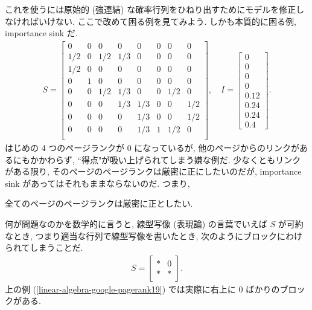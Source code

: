 \documentclass[openany, a4paper, oneside]{jsbook}
\begin{document}
これを使うには原始的 (強連結) な確率行列をひねり出すためにモデルを修正しなければいけない.
ここで改めて困る例を見てみよう.
しかも本質的に困る例, importance sink だ.
\begin{align}
 S
 =
 \begin{bmatrix}
  0    &    0    &    0    &    0    &    0    &    0    &    0    &    0\\
  1/2    &    0    &    1/2    &    1/3    &    0    &    0    &    0    &    0\\
  1/2    &    0    &    0    &    0    &    0    &    0    &    0    &    0\\
  0    &    1    &    0    &    0    &    0    &    0    &    0    &    0\\
  0    &    0    &    1/2    &    1/3    &    0    &    0    &    1/2    &    0\\
  0    &    0    &    0    &    1/3    &    1/3    &    0    &    0    &    1/2\\
  0    &    0    &    0    &    0    &    1/3    &    0    &    0    &    1/2\\
  0    &    0    &    0    &    0    &    1/3    &    1    &    1/2    &    0\\
 \end{bmatrix}
 , \quad
 I
 =
 \begin{bmatrix}
  0\\
  0\\
  0\\
  0\\
  0.12\\
  0.24\\
  0.24\\
  0.4
 \end{bmatrix}. \label{linear-algebra-google-pagerank19}
\end{align}
はじめの 4 つのページランクが 0 になっているが,
他のページからのリンクがあるにもかかわらず, ``得点"が吸い上げられてしまう嫌な例だ.
少なくともリンクがある限り, そのページのページランクは厳密に正にしたいのだが,
importance sink があってはそれもままならないのだ.
つまり,
\begin{req}
全てのページのページランクは厳密に正としたい.
\end{req}

何が問題なのかを数学的に言うと, 線型写像 (表現論) の言葉でいえば
$S$ が可約なとき,
つまり適当な行列で線型写像を書いたとき, 次のようにブロックにわけられてしまうことだ.
\begin{align}
 S
 =
 \begin{bmatrix}
  \ast    &    0 \\
  \ast    &    \ast
 \end{bmatrix}.
\end{align}
上の例 (\ref{linear-algebra-google-pagerank19}) では実際に右上に 0 ばかりのブロックがある.
\end{document}

